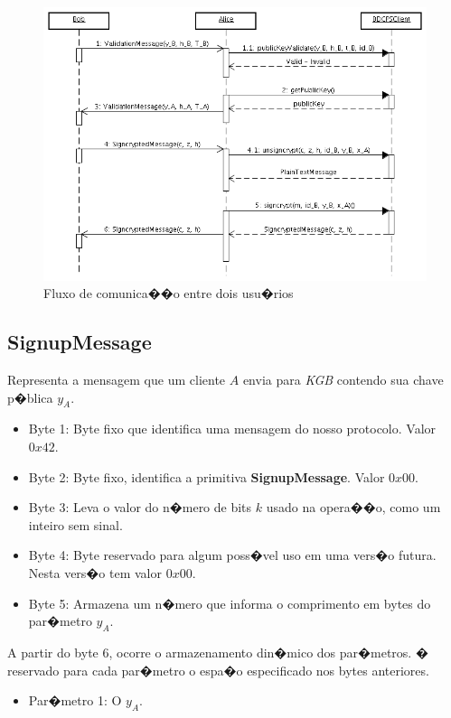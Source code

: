 \documentclass[a4paper,capchap,espacoduplo,normaltoc]{abntepusp}
\begin{document}
\begin{figure}[h]
	\centering	\includegraphics[width=1.00\textwidth]{figuras/SequenceDiagramClient.png}
	\caption{Fluxo de comunica��o entre dois usu�rios}	
	\label{fig:SequenceDiagramClient}
\end{figure}

\subsection{SignupMessage}
Representa a mensagem que um cliente $A$ envia para \emph{KGB} contendo sua chave p�blica $y_A$.

\begin{itemize}
	\item Byte 1: Byte fixo que identifica uma mensagem do nosso protocolo. Valor $0x42$.
	\item Byte 2: Byte fixo, identifica a primitiva \textbf{SignupMessage}. Valor $0x00$.
	\item Byte 3: Leva o valor do n�mero de bits $k$ usado na opera��o, como um inteiro sem sinal.
	\item Byte 4: Byte reservado para algum poss�vel uso em uma vers�o futura. Nesta vers�o tem valor $0x00$.	
	\item Byte 5: Armazena um n�mero que informa o comprimento em bytes do par�metro $y_A$.
\end{itemize}	
A partir do byte 6, ocorre o armazenamento din�mico dos par�metros. � reservado para cada par�metro o espa�o especificado nos bytes anteriores.
\begin{itemize}
	\item Par�metro 1: O $y_A$.
\end{itemize}
\end{document}
